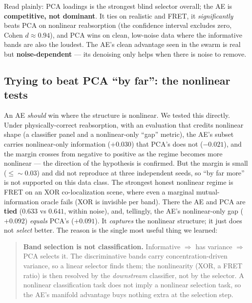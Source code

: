 \documentclass[11pt]{article}
\begin{document}
Read plainly: PCA loadings is the strongest blind selector overall; the AE is \textbf{competitive,
not dominant}. It ties on realistic and FRET, it \emph{significantly} beats PCA on nonlinear
reabsorption (the confidence interval excludes zero, Cohen $d \approx 0.94$), and PCA wins on clean,
low-noise data where the informative bands are also the loudest. The AE's clean advantage seen in the
swarm is real but \textbf{noise-dependent} --- its denoising only helps when there is noise to remove.

\subsection{Trying to beat PCA ``by far'': the nonlinear tests}
An AE \emph{should} win where the structure is nonlinear. We tested this directly. Under
physically-correct reabsorption, with an evaluation that credits nonlinear shape (a classifier panel
and a nonlinear-only ``gap'' metric), the AE's subset carries nonlinear-only information ($+0.030$)
that PCA's does not ($-0.021$), and the margin crosses from negative to positive as the regime
becomes more nonlinear --- the direction of the hypothesis is confirmed. But the margin is small
($\le\!\sim\!0.03$) and did not reproduce at three independent seeds, so ``by far more'' is not
supported on this data class. The strongest honest nonlinear regime is FRET on an XOR co-localization
scene, where even a marginal mutual-information oracle fails (XOR is invisible per band). There the
AE and PCA are \textbf{tied} ($0.633$ vs $0.641$, within noise), and, tellingly, the AE's
nonlinear-only gap ($+0.092$) \emph{equals} PCA's ($+0.091$). It \emph{captures} the nonlinear
structure; it just does not \emph{select} better. The reason is the single most useful thing we
learned:

\begin{quote}
\textbf{Band selection is not classification.} Informative $\Rightarrow$ has variance $\Rightarrow$
PCA selects it. The discriminative bands carry concentration-driven variance, so a linear selector
finds them; the nonlinearity (XOR, a FRET ratio) is then resolved by the \emph{downstream}
classifier, not by the selector. A nonlinear classification task does not imply a nonlinear
selection task, so the AE's manifold advantage buys nothing extra at the selection step.
\end{quote}
\end{document}
